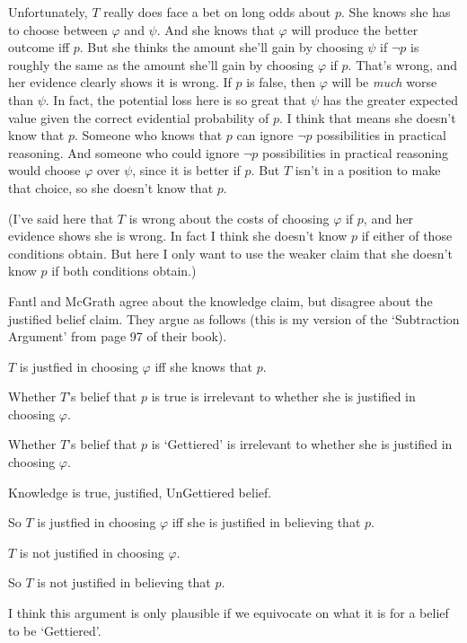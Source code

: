 Unfortunately, $T$ really does face a bet on long odds about $p$. She knows she has to choose between $\varphi$ and $\psi$. And she knows that $\varphi$ will produce the better outcome iff $p$. But she thinks the amount she'll gain by choosing $\psi$ if $\neg p$ is roughly the same as the amount she'll gain by choosing $\varphi$ if $p$. That's wrong, and her evidence clearly shows it is wrong. If $p$ is false, then $\varphi$ will be \textit{much} worse than $\psi$. In fact, the potential loss here is so great that $\psi$ has the greater expected value given the correct evidential probability of $p$. I think that means she doesn't know that $p$. Someone who knows that $p$ can ignore $\neg p$ possibilities in practical reasoning. And someone who could ignore $\neg p$ possibilities in practical reasoning would choose $\varphi$ over $\psi$, since it is better if $p$. But $T$ isn't in a position to make that choice, so she doesn't know that $p$.

(I've said here that $T$ is wrong about the costs of choosing $\varphi$ if $p$, and her evidence shows she is wrong. In fact I think she doesn't know $p$ if either of those conditions obtain. But here I only want to use the weaker claim that she doesn't know $p$ if both conditions obtain.)

Fantl and McGrath agree about the knowledge claim, but disagree about the justified belief claim. They argue as follows (this is my version of the `Subtraction Argument' from page 97 of their book).

\begin{enumerate*}
\item $T$ is justfied in choosing $\varphi$ iff she knows that $p$.
\item Whether $T$'s belief that $p$ is true is irrelevant to whether she is justified in choosing $\varphi$.
\item Whether $T$'s belief that $p$ is `Gettiered' is irrelevant to whether she is justified in choosing $\varphi$.
\item Knowledge is true, justified, UnGettiered belief.
\item So $T$ is justfied in choosing $\varphi$ iff she is justified in believing that $p$.
\item $T$ is not justified in choosing $\varphi$.
\item So $T$ is not justified in believing that $p$.
\end{enumerate*}

\noindent I think this argument is only plausible if we equivocate on what it is for a belief to be `Gettiered'.

